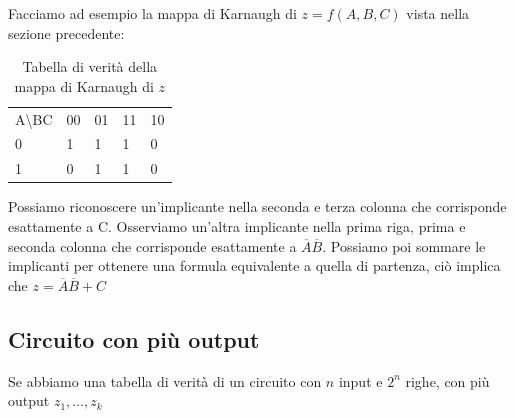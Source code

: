 Facciamo ad esempio la mappa di Karnaugh di $ z = f(A,B,C) $ vista nella sezione precedente:

\begin{table}[H]
	\centering
	\caption{Tabella di verità della mappa di Karnaugh di $z$}
	\label{tab:karnaugh}
	\begin{tabular}{lllll}
		A\textbackslash{}BC    & 00                     & 01                     & 11                     & 10                     \\ \cline{2-5} 
		\multicolumn{1}{l|}{0} & \multicolumn{1}{l|}{1} & \multicolumn{1}{l|}{1} & \multicolumn{1}{l|}{1} & \multicolumn{1}{l|}{0} \\ \cline{2-5} 
		\multicolumn{1}{l|}{1} & \multicolumn{1}{l|}{0} & \multicolumn{1}{l|}{1} & \multicolumn{1}{l|}{1} & \multicolumn{1}{l|}{0} \\ \cline{2-5} 
	\end{tabular}
\end{table}

Possiamo riconoscere un'implicante nella seconda e terza colonna che corrisponde esattamente a C. Osserviamo un'altra implicante nella prima riga, prima e seconda colonna che corrisponde esattamente a $ \overbar{A}\overbar{B} $. Possiamo poi sommare le implicanti per ottenere una formula equivalente a quella di partenza, ciò implica che $ z =  \overbar{A}\overbar{B} + C $


\subsection{Circuito con più output}
Se abbiamo una tabella di verità di un circuito con $ n $ input e $ 2^n $ righe, con più output $ z_1, \dots, z_k $
